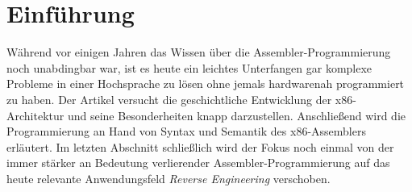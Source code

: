 \section{Einführung}
Während vor einigen Jahren das Wissen über die Assembler-Programmierung noch unabdingbar war, ist es heute ein leichtes Unterfangen gar komplexe Probleme in einer Hochsprache zu lösen ohne jemals hardwarenah programmiert zu haben.
Der Artikel versucht die geschichtliche Entwicklung der x86-Architektur und seine Besonderheiten knapp darzustellen. Anschließend wird die Programmierung an Hand von Syntax und Semantik des x86-Assemblers erläutert. Im letzten Abschnitt schließlich wird der Fokus noch einmal von der immer stärker an Bedeutung verlierender Assembler-Programmierung auf das heute relevante Anwendungsfeld \emph{Reverse Engineering} verschoben.
